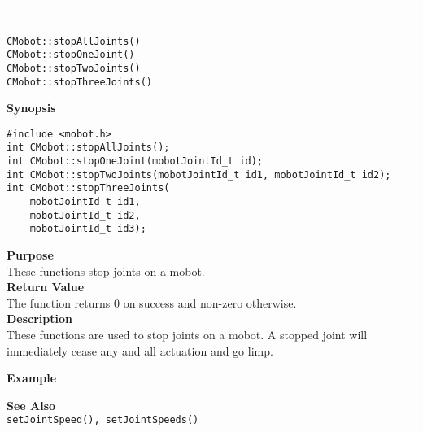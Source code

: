 \noindent
\vspace{5pt}
\rule{4.5in}{0.015in}\\
\noindent
{\LARGE \texttt{CMobot::stopAllJoints()}}\\
{\LARGE \texttt{CMobot::stopOneJoint()}}\\
{\LARGE \texttt{CMobot::stopTwoJoints()}}\\
{\LARGE \texttt{CMobot::stopThreeJoints()}}\\
{}

\noindent
{\bf Synopsis}
\vspace{-8pt}
\begin{verbatim}
#include <mobot.h>
int CMobot::stopAllJoints();
int CMobot::stopOneJoint(mobotJointId_t id);
int CMobot::stopTwoJoints(mobotJointId_t id1, mobotJointId_t id2);
int CMobot::stopThreeJoints(
    mobotJointId_t id1,
    mobotJointId_t id2,
    mobotJointId_t id3);
\end{verbatim}

\noindent
{\bf Purpose}\\
These functions stop joints on a mobot.\\

\noindent
{\bf Return Value}\\
The function returns 0 on success and non-zero otherwise.\\

\noindent
{\bf Description}\\
These functions are used to stop joints on a mobot. A stopped joint
will immediately cease any and all actuation and go limp.

\noindent
{\bf Example}\\
\noindent

\noindent
{\bf See Also}\\
\texttt{setJointSpeed(), setJointSpeeds()}

